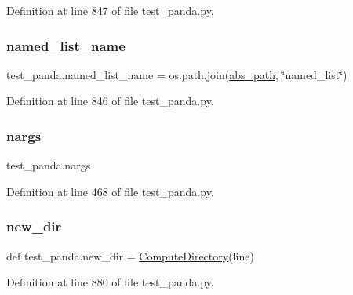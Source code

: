 Definition at line 847 of file test\+\_\+panda.\+py.

\mbox{\label{namespacetest__panda_a55a11ca1425cca9bf61f5e1047db06a0}} 
\subsubsection{\texorpdfstring{named\+\_\+list\+\_\+name}{named\_list\_name}}
{\footnotesize\ttfamily test\+\_\+panda.\+named\+\_\+list\+\_\+name = os.\+path.\+join(\hyperlink{namespacetest__panda_a78bb23566d04ac65a03195681449d2c0}{abs\+\_\+path}, \char`\"{}named\+\_\+list\char`\"{})}



Definition at line 846 of file test\+\_\+panda.\+py.

\mbox{\label{namespacetest__panda_a2c3b827ff02e8b5a6fc657d80c20d90e}} 
\subsubsection{\texorpdfstring{nargs}{nargs}}
{\footnotesize\ttfamily test\+\_\+panda.\+nargs}



Definition at line 468 of file test\+\_\+panda.\+py.

\mbox{\label{namespacetest__panda_a265178f28ffed4a3471bb1ae2ccfa2c8}} 
\subsubsection{\texorpdfstring{new\+\_\+dir}{new\_dir}}
{\footnotesize\ttfamily def test\+\_\+panda.\+new\+\_\+dir = \hyperlink{namespacetest__panda_aecad727491366ab009da0c1bc773571e}{Compute\+Directory}(line)}



Definition at line 880 of file test\+\_\+panda.\+py.

\mbox{\label{namespacetest__panda_aea794e355dfc20d01e029cde56d3501f}} 
